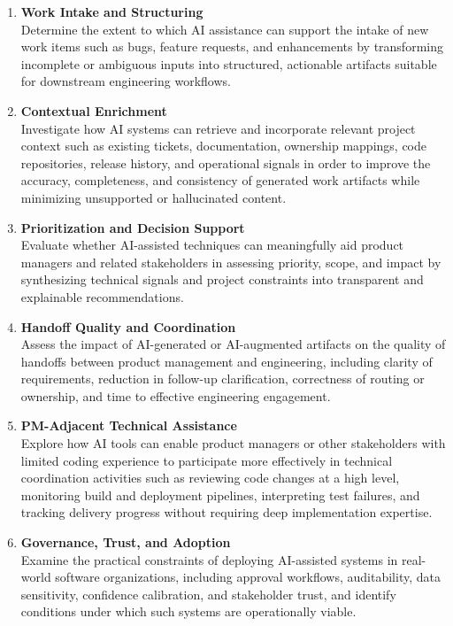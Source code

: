 \documentclass[11pt]{article}
\begin{document}
\begin{enumerate}[label=\textbf{O\arabic*.}]
    \item \textbf{Work Intake and Structuring} \\
    Determine the extent to which AI assistance can support the intake of new work items such as bugs, feature requests, and enhancements by transforming incomplete or ambiguous inputs into structured, actionable artifacts suitable for downstream engineering workflows.

    \item \textbf{Contextual Enrichment} \\
    Investigate how AI systems can retrieve and incorporate relevant project context such as existing tickets, documentation, ownership mappings, code repositories, release history, and operational signals in order to improve the accuracy, completeness, and consistency of generated work artifacts while minimizing unsupported or hallucinated content.

    \item \textbf{Prioritization and Decision Support} \\
    Evaluate whether AI-assisted techniques can meaningfully aid product managers and related stakeholders in assessing priority, scope, and impact by synthesizing technical signals and project constraints into transparent and explainable recommendations.

    \item \textbf{Handoff Quality and Coordination} \\
    Assess the impact of AI-generated or AI-augmented artifacts on the quality of handoffs between product management and engineering, including clarity of requirements, reduction in follow-up clarification, correctness of routing or ownership, and time to effective engineering engagement.

    \item \textbf{PM-Adjacent Technical Assistance} \\
    Explore how AI tools can enable product managers or other stakeholders with limited coding experience to participate more effectively in technical coordination activities such as reviewing code changes at a high level, monitoring build and deployment pipelines, interpreting test failures, and tracking delivery progress without requiring deep implementation expertise.

    \item \textbf{Governance, Trust, and Adoption} \\
    Examine the practical constraints of deploying AI-assisted systems in real-world software organizations, including approval workflows, auditability, data sensitivity, confidence calibration, and stakeholder trust, and identify conditions under which such systems are operationally viable.
\end{enumerate}
\end{document}
